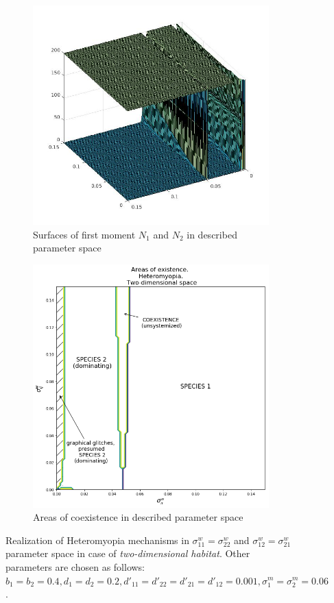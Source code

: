 \documentclass[%
 aip,
rsi,%
 amsmath,amssymb,
 reprint,%
]{revtex4-1}
\begin{document}
\begin{figure}[ht]
	\centering
	\begin{subfigure}{.5\textwidth}
		\centering
		\includegraphics[width=.93\linewidth]{N1N2hm04D2.jpg}
		\caption{Surfaces of first moment \(N_1\) and \(N_2\) in described parameter space}
		\label{fig:hmd2:sub1}
	\end{subfigure}%
	\begin{subfigure}{.5\textwidth}
		\centering
		\includegraphics[width=.93\linewidth]{arhm08d2.png}
		\caption{Areas of coexistence in described parameter space}
		\label{fig:hmd2:sub2}
	\end{subfigure}
	\caption{Realization of Heteromyopia mechanisms in  $\sigma_{11}^{w}=\sigma_{22}^{w}$ and $\sigma_{12}^{w}=\sigma_{21}^{w}$ parameter space in case of \emph{two-dimensional habitat}. Other parameters are chosen as follows: $b_{1}=b_{2}=0.4
		, d_{1}=d_{2}=0.2
		, d'_{11}=d'_{22}=d'_{21}=d'_{12}=0.001,
		\sigma_{1}^{m}=\sigma_{2}^{m}=0.06$. }
	\label{fig:hmd2}
\end{figure}
\end{document}
